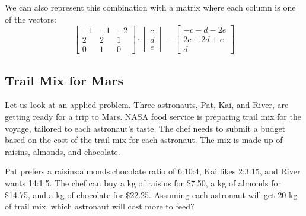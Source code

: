 We can also represent this combination with a matrix where each column is one of the vectors:
$$\begin{bmatrix}
-1 & -1 & -2\\
2 & 2 & 1\\
0 & 1 & 0
\end{bmatrix} \cdot \begin{bmatrix}
c\\
d\\
e
\end{bmatrix} = \begin{bmatrix}
-c - d - 2e\\
2c + 2d + e\\
d
\end{bmatrix}$$

	



\subsection{Trail Mix for Mars}
Let us look at an applied problem. Three astronauts, Pat, Kai, and River, are getting ready for a trip to Mars. NASA food service is preparing trail mix for the voyage, tailored to each astronaut's taste. The chef needs to submit a budget based on the cost of the trail mix for each astronaut. The mix is made up of raisins, almonds, and chocolate.

Pat prefers a raisins:almonds:chocolate ratio of 6:10:4, Kai likes 2:3:15, and River wants 14:1:5. The chef can buy a kg of raisins for \$7.50, a kg of almonds for \$14.75, and a kg of chocolate for \$22.25. Assuming each astronaut will get 20 kg of trail mix, which astronaut will cost more to feed?

